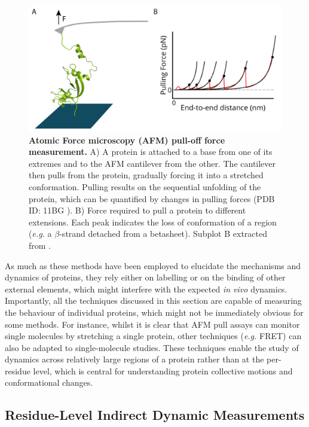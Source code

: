 \begin{figure}[tbh!]
    \centering
    \includegraphics[width=1\linewidth]{figures/experimental_techniques_afm.pdf}
    \caption{\textbf{Atomic Force \Gls{microscopy} (AFM) pull-off force measurement.} A) A protein is attached to a base from one of its extremes and to the AFM cantilever from the other. The cantilever then pulls from the protein, gradually forcing it into a stretched \gls{conformation}. Pulling results on the sequential unfolding of the protein, which can be quantified by changes in pulling forces (PDB ID: 11BG \cite{vitagliano_potential_1999}). B) Force required to pull a protein to different extensions. Each peak indicates the loss of \gls{conformation} of a region (\textit{e.g.} a $\beta$-strand detached from a \gls{betasheet}). Subplot B extracted from \cite{van_gils_protein_2024}.}
    \label{fig:chapter1:afm}
\end{figure}


As much as these methods have been employed to elucidate the mechanisms and \gls{dynamics} of proteins, they rely either on labelling or on the binding of other external elements, which might interfere with the expected \textit{in vivo} \gls{dynamics}. 
Importantly, all the techniques discussed in this section are capable of measuring the behaviour of individual proteins, which might not be immediately obvious for some methods. For instance, whilst it is clear that AFM pull assays can monitor single molecules by stretching a single protein, other techniques (\textit{e.g.} FRET) can also be adapted to single-molecule studies. These techniques enable
the study of \gls{dynamics} across relatively large regions of a protein rather than at the per-residue level, which is central for understanding protein collective motions and conformational changes.


\subsection{Residue-Level Indirect Dynamic Measurements}

